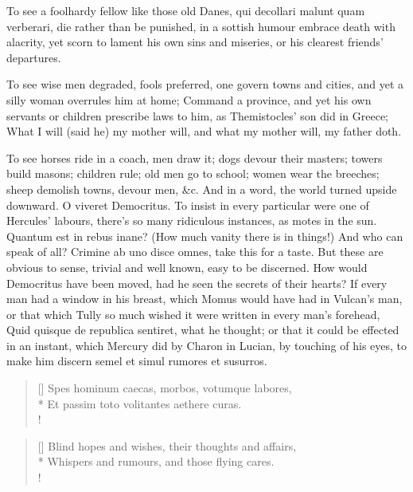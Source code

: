 {To see a foolhardy fellow like those old Danes, qui decollari malunt
quam verberari, die rather than be punished, in a sottish humour
embrace death with alacrity, yet scorn to lament his own sins and
miseries, or his clearest friends' departures.

To see wise men degraded, fools preferred, one govern towns and cities,
and yet a silly woman overrules him at home; Command a province,
and yet his own servants or children prescribe laws to him, as
Themistocles' son did in Greece; What I will (said he) my mother
will, and what my mother will, my father doth.

To see horses ride in a coach, men draw it; dogs devour their masters; towers build masons;
children rule; old men go to school; women wear the breeches;
sheep demolish towns, devour men, \&c. And in a word, the world
turned upside downward. O viveret Democritus.
To insist in every particular were one of Hercules' labours,
there's so many ridiculous instances, as motes in the sun. Quantum est
in rebus inane? (How much vanity there is in things!) And who can speak
of all? Crimine ab uno disce omnes, take this for a taste.
But these are obvious to sense, trivial and well known, easy to be
discerned. How would Democritus have been moved, had he seen the
secrets of their hearts? If every man had a window in his breast, which
Momus would have had in Vulcan's man, or that which Tully so much
wished it were written in every man's forehead, Quid quisque de
republica sentiret, what he thought; or that it could be effected in an
instant, which Mercury did by Charon in Lucian, by touching of his
eyes, to make him discern semel et simul rumores et susurros.

\settowidth{\versewidth}{Spes hominum caecas, morbos, votumque labores,}
\begin{verse}[\versewidth]
Spes hominum caecas, morbos, votumque labores,\\*
Et passim toto volitantes aethere curas.\\!
\end{verse}

\settowidth{\versewidth}{Blind hopes and wishes, their thoughts and affairs,}
\begin{verse}[\versewidth]
Blind hopes and wishes, their thoughts and affairs,\\*
Whispers and rumours, and those flying cares.\\!
\end{verse}

}
